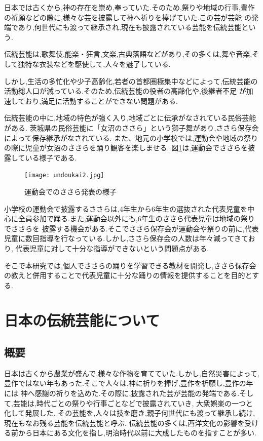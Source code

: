 \documentclass[12pt]{ltjsarticle}
\begin{document}

日本では古くから,神の存在を崇め,奉っていた.そのため,祭りや地域の行事,豊作の祈願などの際に,様々な芸を披露して神へ祈りを捧げていた.この芸が芸能
の発端であり,何世代にも渡って継承され,現在も披露されている芸能を伝統芸能という.

伝統芸能は,歌舞伎,能楽・狂言,文楽,古典落語などがあり,その多くは,舞や音楽,そして独特な衣装などを駆使して,人々を魅了している.

しかし,生活の多忙化や少子高齢化,若者の首都圏極集中などによって,伝統芸能の活動総人口が減っている.そのため,伝統芸能の役者の高齢化や,後継者不足
が加速しており,満足に活動することができない問題がある.


伝統芸能の中に,地域の特色が強く入り,地域ごとに伝承がなされている民俗芸能がある.
茨城県の民俗芸能に「女沼のささら」という獅子舞があり,ささら保存会によって保存継承がなされている.
また、地元の小学校では,運動会や地域の祭りの際に児童が女沼のささらを踊り観客を楽しませる.
図\ref{fig:運動会}は,運動会でささらを披露している様子である.
\begin{figure}[h]
\begin{center}
 \texttt{[image: undoukai2.jpg]}
\end{center}
 \caption{運動会でのささら発表の様子}
 \label{fig:運動会}
\end{figure}


小学校の運動会で披露するささらは,4年生から6年生の選抜された代表児童を中心に全員参加で踊る.また,運動会以外にも,6年生のささら代表児童は地域の祭りでささらを
披露する機会がある.そこでささら保存会が運動会や祭りの前に,代表児童に数回指導を行なっている.しかし,ささら保存会の人数は年々減ってきており,
代表児童に対して十分な指導ができないという問題点がある.

そこで本研究では,個人でささらの踊りを学習できる教材を開発し,ささら保存会の教えと併用することで代表児童に十分な踊りの情報を提供することを目的とする.

\newpage
\section{日本の伝統芸能について}

\subsection{概要}

日本は古くから農業が盛んで,様々な作物を育てていた.しかし,自然災害によって,豊作ではない年もあった.そこで人々は,神に祈りを捧げ,豊作を祈願し,豊作の年には
神へ感謝の祈りを込めた.その際に,披露された芸が芸能の発端である.そして,芸能は,時代ごとの祭りや行事ごとなどで披露されていき,
大衆娯楽の一つと化して発展した.
その芸能を,人々は技を磨き,親子何世代にも渡って継承し続け,現在もなお残る芸能を伝統芸能と呼ぶ.
伝統芸能の多くは,西洋文化の影響を受ける前から日本にある文化を指し,明治時代以前に大成したものを指すことが多い.
\end{document}
